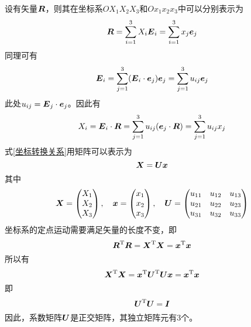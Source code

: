 设有矢量$\boldsymbol{R}$，则其在坐标系$OX_1X_2X_3$和$Ox_1x_2x_3$中可以分别表示为
\begin{equation*}
	\boldsymbol{R} = \sum_{i=1}^3 X_i \boldsymbol{E}_i = \sum_{i=1}^3 x_j \boldsymbol{e}_j
\end{equation*}
同理可有
\begin{equation*}
	\boldsymbol{E}_i = \sum_{j=1}^3 (\boldsymbol{E}_i\cdot \boldsymbol{e}_j) \boldsymbol{e}_j = \sum_{j=1}^3 u_{ij} \boldsymbol{e}_j
\end{equation*}
此处$u_{ij} = \boldsymbol{E}_j\cdot \boldsymbol{e}_j$。因此有
\begin{equation}
	X_i = \boldsymbol{E}_i \cdot \boldsymbol{R} = \sum_{j=1}^3 u_{ij} (\boldsymbol{e}_j \cdot \boldsymbol{R}) = \sum_{j=1}^3 u_{ij} x_j
	\label{坐标转换关系}
\end{equation}
式\eqref{坐标转换关系}用矩阵可以表示为
\begin{equation}
	\boldsymbol{X} = \boldsymbol{U}\boldsymbol{x}
\end{equation}
其中
\begin{equation*}
	\boldsymbol{X} = \begin{pmatrix} X_1 \\ X_2 \\ X_3 \end{pmatrix},\quad \boldsymbol{x} = \begin{pmatrix} x_1 \\ x_2 \\ x_3 \end{pmatrix},\quad \boldsymbol{U} = \begin{pmatrix} u_{11} & u_{12} & u_{13} \\ u_{21} & u_{22} & u_{23} \\ u_{31} & u_{32} & u_{33} \end{pmatrix}
\end{equation*}
坐标系的定点运动需要满足矢量的长度不变，即
\begin{equation*}
	\boldsymbol{R}^{\mathrm{T}} \boldsymbol{R} = \boldsymbol{X}^{\mathrm{T}} \boldsymbol{X} = \boldsymbol{x}^{\mathrm{T}} \boldsymbol{x}
\end{equation*}
所以有
\begin{equation*}
	\boldsymbol{X}^{\mathrm{T}} \boldsymbol{X} = \boldsymbol{x}^{\mathrm{T}} \boldsymbol{U}^{\mathrm{T}} \boldsymbol{U} \boldsymbol{x} = \boldsymbol{x}^{\mathrm{T}} \boldsymbol{x}
\end{equation*}
即
\begin{equation*}
	\boldsymbol{U}^{\mathrm{T}} \boldsymbol{U} = \boldsymbol{I}
\end{equation*}
因此，系数矩阵$\boldsymbol{U}$是正交矩阵，其独立矩阵元有3个。

